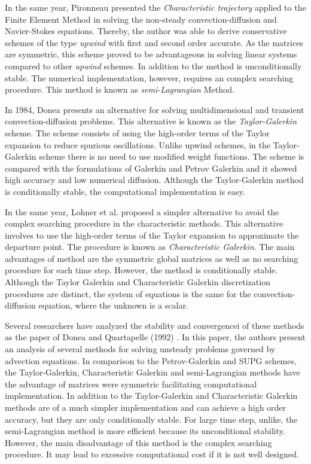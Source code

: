 \medskip
In the same year, Pironneau \cite{pironneau1982} presented
 the \textit{Characteristic trajectory}
 applied to the
 Finite Element Method in solving the non-steady convection-diffusion
 and Navier-Stokes equations. Thereby, the author was able
 to derive conservative schemes of the type \textit{upwind}
 with first and second order accurate. As the matrices are symmetric,
 this scheme proved to be advantageous in solving linear
 systems compared to other \textit{upwind} schemes.
 In addition to the method is unconditionally stable.
 The numerical implementation, however, requires an complex searching
 procedure. This method is known as \textit{semi-Lagrangian} Method.

\medskip
In 1984, Donea \cite{donea1984} presents an alternative for
 solving multidimensional and transient convection-diffusion
 problems. This alternative is known as the
 \textit{Taylor-Galerkin} scheme. The scheme consists of using
 the high-order terms of the Taylor expansion to reduce
 spurious oscillations. Unlike upwind schemes, in the
 Taylor-Galerkin scheme there is no need to use modified
 weight functions. The scheme is compared with the formulations
 of Galerkin and Petrov Galerkin and it showed high accuracy and
 low numerical diffusion. Although the Taylor-Galerkin method
 is conditionally stable, the computational implementation is easy.


\medskip
In the same year, Lohner et al. \cite{lohner1984} 
proposed a simpler alternative
to avoid the complex searching procedure in the characteristic
methods. This alternative involves to use the high-order terms of
the Taylor expansion to approximate the departure point.
The procedure is known as \textit{Characteristic Galerkin}.
The main advantages of method are the symmetric global matrices
as well as no searching procedure for each time step. However, the
method is conditionally stable.
Although the Taylor Galerkin and
 Characteristic Galerkin discretization procedures are distinct,
 the system of equations is the same for the convection-diffusion
 equation, where the unknown is a scalar.


\medskip
Several researchers have analyzed the stability and convergencei
 of these methods as the paper of Donea and Quartapelle (1992)
\cite{donea1992}. In this paper, the authors present an analysis
of several methods for solving unsteady problems governed by
advection equations. 
In comparison to the Petrov-Galerkin and
 SUPG schemes, the Taylor-Galerkin, Characteristic Galerkin and
 semi-Lagrangian methods have the advantage of matrices were
 symmetric facilitating computational implementation.
 In addition to the Taylor-Galerkin and Characteristic Galerkin methods
 are of a much simpler implementation and can achieve a high order
accuracy, but they are only conditionally stable.
 For large time step, unlike, the semi-Lagrangian method is
 more efficient because its unconditional stability.
 However, the main disadvantage of this method is the complex 
 searching procedure. It may lead to excessive computational cost
 if it is not well designed.

